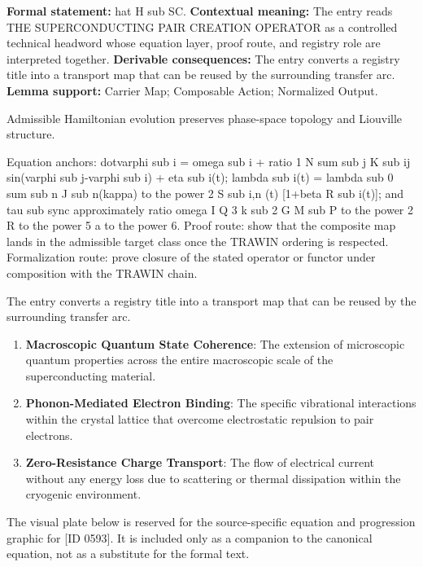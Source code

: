 \begingroup\footnotesize\setlength{\emergencystretch}{3em}\sloppy
\textbf{Formal statement:} hat H sub SC. \textbf{Contextual meaning:} The entry reads THE SUPERCONDUCTING PAIR CREATION OPERATOR as a controlled technical headword whose equation layer, proof route, and registry role are interpreted together. \textbf{Derivable consequences:} The entry converts a registry title into a transport map that can be reused by the surrounding transfer arc. \textbf{Lemma support:} Carrier Map; Composable Action; Normalized Output.\par
\endgroup

Admissible Hamiltonian evolution preserves phase-space topology and Liouville structure.

Equation anchors: dotvarphi sub i = omega sub i + ratio 1 N sum sub j K sub ij sin(varphi sub j-varphi sub i) + eta sub i(t); lambda sub i(t) = lambda sub 0 sum sub n J sub n(kappa) to the power 2 S sub i,n (t) [1+beta R sub i(t)]; and tau sub sync approximately ratio omega I Q 3 k sub 2 G M sub P to the power 2 R to the power 5 a to the power 6. Proof route: show that the composite map lands in the admissible target class once the TRAWIN ordering is respected. Formalization route: prove closure of the stated operator or functor under composition with the TRAWIN chain.

The entry converts a registry title into a transport map that can be reused by the surrounding transfer arc.
\endgroup

\begin{enumerate}[leftmargin=1.6em,itemsep=6pt,topsep=4pt]
\item \textbf{Macroscopic Quantum State Coherence}: The extension of microscopic quantum properties across the entire macroscopic scale of the superconducting material.
\item \textbf{Phonon-Mediated Electron Binding}: The specific vibrational interactions within the crystal lattice that overcome electrostatic repulsion to pair electrons.
\item \textbf{Zero-Resistance Charge Transport}: The flow of electrical current without any energy loss due to scattering or thermal dissipation within the cryogenic environment.
\end{enumerate}

\begingroup\footnotesize\sloppy
The visual plate below is reserved for the source-specific equation and progression graphic for [ID 0593]. It is included only as a companion to the canonical equation, not as a substitute for the formal text.
\par\endgroup
\ifTZPDarkEdition
{}
\fi

